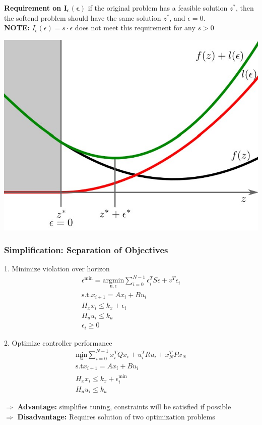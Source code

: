 \begin{minipage}[]{0.49\linewidth}
\textbf{Requirement on $\mathbf{I_\epsilon(\epsilon)}$}
if the original problem has a feasible solution $z^*$, then the softend problem should have the same solution $z^*$, and $\epsilon = 0$.\\
\textbf{NOTE:} $I_\epsilon(\epsilon) = s \cdot \epsilon$ does not meet this requirement for any $s > 0$ \\
\end{minipage}
\begin{minipage}[]{0.49\linewidth}
\includegraphics[width= 0.99\linewidth]{MPC_summary/Images/Quadratic_penalty.jpg}
\end{minipage}
\subsubsection{Simplification: Separation of Objectives}
\begin{minipage}{0.49\linewidth}
1. Minimize violation over horizon
\begin{gather*}
\epsilon^{\mathrm{min}}= \underset{\mathrm{u},\epsilon}{\mathrm{argmin}}\sum^{N-1}_{i=0} \epsilon^T_i S \epsilon + v^T \epsilon_i\\
\mathrm{s.t.} x_{i+1} = Ax_i + Bu_i\\
H_x x_i \leq k_x + \epsilon_i\\
H_u u_i \leq k_u\\
\epsilon_i \geq 0
\end{gather*}
\end{minipage}
\begin{minipage}{0.49\linewidth}
2. Optimize controller performance
\begin{gather*}
    \underset{\mathrm{u}}{\mathrm{min}}\sum^{N-1}_{i=0} x_i^T Qx_i + u_i^T R u_i + x_N^T P x_N\\
    \mathrm{s.t} x_{i+1} = Ax_i + Bu_i \\
    H_x x_i \leq k_x + \epsilon^\mathrm{min}_i\\
    H_u u_i \leq k_u
\end{gather*}
\end{minipage}
$\Rightarrow$ \textbf{Advantage:} simplifies tuning, constraints will be satisfied if possible\\
$\Rightarrow$ \textbf{Disadvantage:} Requires solution of two optimization problems
